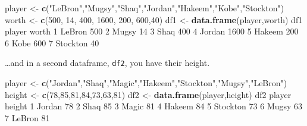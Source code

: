 \documentclass[
]{book}
\newenvironment{Shaded}{\begin{snugshade}}{\end{snugshade}}
\newcommand{\DecValTok}[1]{\textcolor[rgb]{0.00,0.00,0.81}{#1}}
\newcommand{\KeywordTok}[1]{\textcolor[rgb]{0.13,0.29,0.53}{\textbf{#1}}}
\newcommand{\NormalTok}[1]{#1}
\newcommand{\StringTok}[1]{\textcolor[rgb]{0.31,0.60,0.02}{#1}}
\begin{document}
\begin{Shaded}
\begin{Highlighting}[]
\NormalTok{player <-}\StringTok{ }\KeywordTok{c}\NormalTok{(}\StringTok{"LeBron"}\NormalTok{,}\StringTok{"Mugsy"}\NormalTok{,}\StringTok{"Shaq"}\NormalTok{,}\StringTok{"Jordan"}\NormalTok{,}\StringTok{"Hakeem"}\NormalTok{,}\StringTok{"Kobe"}\NormalTok{,}\StringTok{"Stockton"}\NormalTok{)}
\NormalTok{worth <-}\StringTok{ }\KeywordTok{c}\NormalTok{(}\DecValTok{500}\NormalTok{, }\DecValTok{14}\NormalTok{, }\DecValTok{400}\NormalTok{, }\DecValTok{1600}\NormalTok{, }\DecValTok{200}\NormalTok{, }\DecValTok{600}\NormalTok{,}\DecValTok{40}\NormalTok{)}
\NormalTok{df1 <-}\StringTok{ }\KeywordTok{data.frame}\NormalTok{(player,worth)}
\NormalTok{df1}
\NormalTok{    player worth}
\DecValTok{1}\NormalTok{   LeBron   }\DecValTok{500}
\DecValTok{2}\NormalTok{    Mugsy    }\DecValTok{14}
\DecValTok{3}\NormalTok{     Shaq   }\DecValTok{400}
\DecValTok{4}\NormalTok{   Jordan  }\DecValTok{1600}
\DecValTok{5}\NormalTok{   Hakeem   }\DecValTok{200}
\DecValTok{6}\NormalTok{     Kobe   }\DecValTok{600}
\DecValTok{7}\NormalTok{ Stockton    }\DecValTok{40}
\end{Highlighting}
\end{Shaded}

\ldots and in a second dataframe, \texttt{df2}, you have their height.

\begin{Shaded}
\begin{Highlighting}[]
\NormalTok{player <-}\StringTok{ }\KeywordTok{c}\NormalTok{(}\StringTok{"Jordan"}\NormalTok{,}\StringTok{"Shaq"}\NormalTok{,}\StringTok{"Magic"}\NormalTok{,}\StringTok{"Hakeem"}\NormalTok{,}\StringTok{"Stockton"}\NormalTok{,}\StringTok{"Mugsy"}\NormalTok{,}\StringTok{"LeBron"}\NormalTok{)}
\NormalTok{height <-}\StringTok{ }\KeywordTok{c}\NormalTok{(}\DecValTok{78}\NormalTok{,}\DecValTok{85}\NormalTok{,}\DecValTok{81}\NormalTok{,}\DecValTok{84}\NormalTok{,}\DecValTok{73}\NormalTok{,}\DecValTok{63}\NormalTok{,}\DecValTok{81}\NormalTok{)}
\NormalTok{df2 <-}\StringTok{ }\KeywordTok{data.frame}\NormalTok{(player,height)}
\NormalTok{df2}
\NormalTok{    player height}
\DecValTok{1}\NormalTok{   Jordan     }\DecValTok{78}
\DecValTok{2}\NormalTok{     Shaq     }\DecValTok{85}
\DecValTok{3}\NormalTok{    Magic     }\DecValTok{81}
\DecValTok{4}\NormalTok{   Hakeem     }\DecValTok{84}
\DecValTok{5}\NormalTok{ Stockton     }\DecValTok{73}
\DecValTok{6}\NormalTok{    Mugsy     }\DecValTok{63}
\DecValTok{7}\NormalTok{   LeBron     }\DecValTok{81}
\end{Highlighting}
\end{Shaded}
\end{document}
